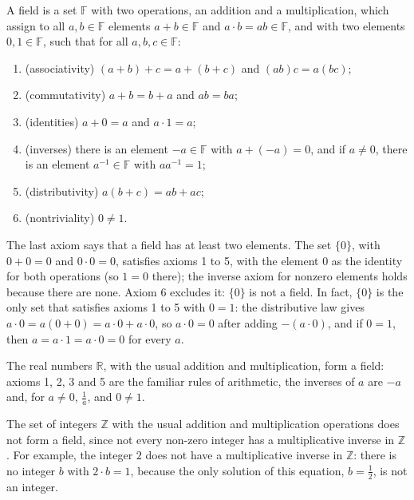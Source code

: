 \begin{definition}[Field]\label{L1-def:field}
    A field is a set $\mathbb{F}$ with two operations, an addition and a multiplication, which assign to all $a, b \in \mathbb{F}$ elements $a + b \in \mathbb{F}$ and $a \cdot b = ab \in \mathbb{F}$, and with two elements $0, 1 \in \mathbb{F}$, such that for all $a, b, c \in \mathbb{F}$:
    \begin{enumerate}
        \item (associativity) $(a + b) + c = a + (b + c)$ and $(ab)c = a(bc)$;
        \item (commutativity) $a + b = b + a$ and $ab = ba$;
        \item (identities) $a + 0 = a$ and $a \cdot 1 = a$;
        \item (inverses) there is an element $-a \in \mathbb{F}$ with $a + (-a) = 0$, and if $a \neq 0$, there is an element $a^{-1} \in \mathbb{F}$ with $aa^{-1} = 1$;
        \item (distributivity) $a(b + c) = ab + ac$;
        \item (nontriviality) $0 \neq 1$.
    \end{enumerate}
\end{definition}

The last axiom says that a field has at least two elements. The set $\{0\}$, with $0 + 0 = 0$ and $0 \cdot 0 = 0$, satisfies axioms 1 to 5, with the element $0$ as the identity for both operations (so $1 = 0$ there); the inverse axiom for nonzero elements holds because there are none. Axiom 6 excludes it: $\{0\}$ is not a field. In fact, $\{0\}$ is the only set that satisfies axioms 1 to 5 with $0 = 1$: the distributive law gives $a \cdot 0 = a(0 + 0) = a \cdot 0 + a \cdot 0$, so $a \cdot 0 = 0$ after adding $-(a \cdot 0)$, and if $0 = 1$, then $a = a \cdot 1 = a \cdot 0 = 0$ for every $a$.

\begin{example}
    The real numbers $\mathbb{R}$, with the usual addition and multiplication, form a field: axioms 1, 2, 3 and 5 are the familiar rules of arithmetic, the inverses of $a$ are $-a$ and, for $a \neq 0$, $\frac{1}{a}$, and $0 \neq 1$.
\end{example}

\begin{example}
    The set of integers $\mathbb{Z}$ with the usual addition and multiplication operations does not form a field, since not every non-zero integer has a multiplicative inverse in $\mathbb{Z}$.
    For example, the integer $2$ does not have a multiplicative inverse in $\mathbb{Z}$: there is no integer $b$ with $2 \cdot b = 1$, because the only solution of this equation, $b = \frac{1}{2}$, is not an integer.
\end{example}

